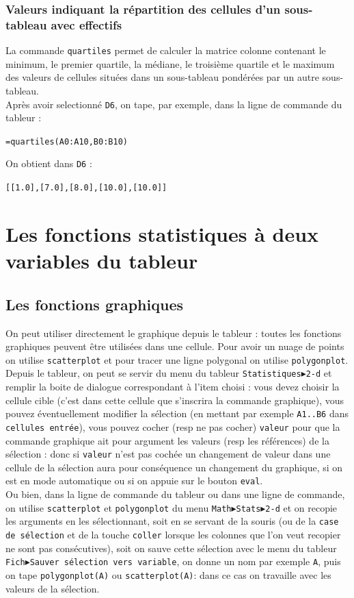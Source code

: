 \documentclass[a4paper,11pt]{book}
\begin{document}
\subsubsection{Valeurs indiquant la r\'epartition  des cellules d'un sous-tableau avec effectifs}
La commande {\tt quartiles} permet de calculer la matrice colonne contenant
le minimum, le premier quartile, la m\'ediane, le troisi\`eme quartile et 
le maximum des valeurs de cellules
 situ\'ees dans un sous-tableau pond\'er\'ees par un autre sous-tableau.\\ 
 Apr\`es avoir selectionn\'e {\tt D6}, on tape, par exemple, dans la ligne de 
commande du tableur :
\begin{center}{\tt =quartiles(A0:A10,B0:B10)}\end{center}
On obtient dans {\tt D6} :
\begin{center}{\tt [[1.0],[7.0],[8.0],[10.0],[10.0]]}\end{center} 
\section{Les fonctions statistiques \`a deux variables du tableur}
\subsection{Les fonctions graphiques}
On peut  utiliser directement le graphique depuis le tableur : toutes les 
fonctions graphiques peuvent \^etre utilis\'ees dans une cellule. Pour avoir un
nuage de points on utilise {\tt scatterplot} et pour tracer une ligne 
polygonal on utilise {\tt polygonplot}.\\
Depuis le tableur, on peut se servir du menu du tableur
{\tt Statistiques$\blacktriangleright$2-d} et remplir la boite de dialogue 
correspondant \`a l'item choisi : vous devez choisir la cellule cible (c'est 
dans cette cellule que s'inscrira la commande graphique), vous pouvez
\'eventuellement modifier la s\'election (en mettant par exemple {\tt A1..B6}
dans {\tt cellules entr\'ee}), vous pouvez cocher (resp ne pas cocher) 
{\tt valeur} pour que la commande graphique ait pour argument les valeurs (resp
les r\'ef\'erences) de la s\'election : donc si {\tt valeur} n'est pas coch\'ee
un changement de valeur dans une cellule de la s\'election aura pour 
cons\'equence un changement du graphique, si on est en mode automatique ou si 
on appuie sur le bouton {\tt eval}.\\
Ou bien, dans la ligne de commande du tableur ou dans une ligne de commande, on
utilise  {\tt scatterplot} et {\tt polygonplot} du menu 
{\tt Math$\blacktriangleright$Stats$\blacktriangleright$2-d} et on recopie les 
arguments en les s\'electionnant, soit en se servant de la souris (ou de la 
{\tt case de s\'election} et de la touche {\tt coller} lorsque les colonnes 
que l'on veut recopier ne sont pas cons\'ecutives), soit on sauve cette 
s\'election avec le menu du tableur {\tt Fich$\blacktriangleright$Sauver 
s\'election vers variable}, on donne un nom par exemple {\tt A}, puis on tape 
{\tt polygonplot(A)} ou {\tt scatterplot(A)}: dans ce cas on travaille avec les
valeurs de la s\'election.\\ 
\end{document}
